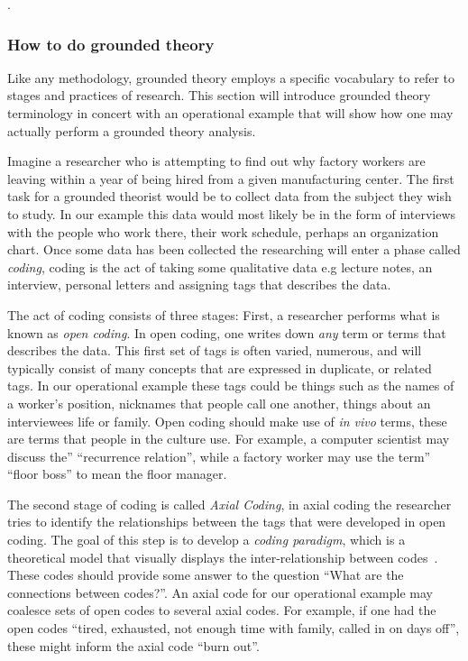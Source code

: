 \documentclass[sigconf]{acmart}
\begin{document}
.


\subsubsection{How to do grounded theory}
Like any methodology, grounded theory employs a specific vocabulary to refer to
stages and practices of research. This section will introduce grounded theory
terminology in concert with an operational example that will show how one may
actually perform a grounded theory analysis.


Imagine a researcher who is attempting to find out why factory workers are
leaving within a year of being hired from a given manufacturing center. The
first task for a grounded theorist would be to collect data from the subject
they wish to study. In our example this data would most likely be in the form of
interviews with the people who work there, their work schedule, perhaps an
organization chart. Once some data has been collected the researching will enter
a phase called \emph{coding}, coding is the act of taking some qualitative data
e.g lecture notes, an interview, personal letters and assigning tags that
describes the data.
 
The act of coding consists of three stages\cite{charmaz2006constructing}: First,
a researcher performs what is known as \emph{open coding}. In open coding, one
writes down \emph{any} term or terms that describes the data. This first set of
tags is often varied, numerous, and will typically consist of many concepts that
are expressed in duplicate, or related tags. In our operational example these
tags could be things such as the names of a worker's position, nicknames that
people call one another, things about an interviewees life or family. Open
coding should make use of \emph{in vivo} terms, these are terms that people in
the culture use. For example, a computer scientist may discuss the''
``recurrence relation'', while a factory worker may use the term'' ``floor
boss'' to mean the floor manager.
 
The second stage of coding is called \emph{Axial Coding}, in axial
coding the researcher tries to identify the relationships between the tags that
were developed in open coding. The goal of this step is to develop a
\emph{coding paradigm}, which is a theoretical model that visually displays the
inter-relationship between codes~\cite{corbin2014basics}. These codes should
provide some answer to the question ``What are the connections between codes?''.
An axial code for our operational example may coalesce sets of open codes to
several axial codes. For example, if one had the open codes ``tired, exhausted,
not enough time with family, called in on days off'', these might inform the
axial code ``burn out''.
 
\end{document}

